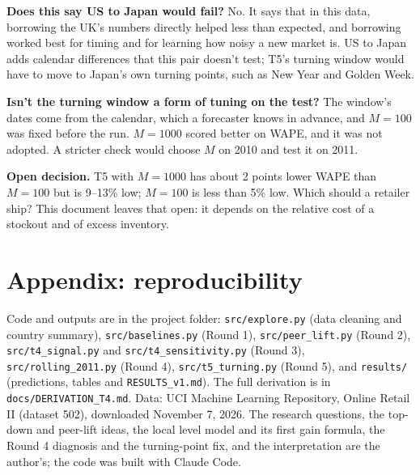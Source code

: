 \documentclass[11pt]{article}
\begin{document}
\textbf{Does this say US to Japan would fail?} No. It says that in this data, borrowing the UK's numbers
directly helped less than expected, and borrowing worked best for timing and for learning how noisy a new
market is. US to Japan adds calendar differences that this pair doesn't test; T5's turning window would
have to move to Japan's own turning points, such as New Year and Golden Week.

\textbf{Isn't the turning window a form of tuning on the test?} The window's dates come from the calendar,
which a forecaster knows in advance, and $M = 100$ was fixed before the run. $M = 1000$ scored better on
WAPE, and it was not adopted. A stricter check would choose $M$ on 2010 and test it on 2011.

\textbf{Open decision.} T5 with $M = 1000$ has about 2 points lower WAPE than $M = 100$ but is 9--13\%
low; $M = 100$ is less than 5\% low. Which should a retailer ship? This document leaves that open: it
depends on the relative cost of a stockout and of excess inventory.

\section*{Appendix: reproducibility}
\sloppy

Code and outputs are in the project folder: \texttt{src/explore.py} (data cleaning and country summary),
\texttt{src/baselines.py} (Round 1), \texttt{src/peer\_lift.py} (Round 2), \texttt{src/t4\_signal.py} and
\texttt{src/t4\_sensitivity.py} (Round 3), \texttt{src/rolling\_2011.py} (Round 4),
\texttt{src/t5\_turning.py} (Round 5), and \texttt{results/} (predictions, tables and
\texttt{RESULTS\_v1.md}). The full derivation is in \texttt{docs/DERIVATION\_T4.md}. Data: UCI Machine
Learning Repository, Online Retail II (dataset 502), downloaded November 7, 2026. The research questions,
the top-down and peer-lift ideas, the local level model and its first gain formula, the Round 4 diagnosis
and the turning-point fix, and the interpretation are the author's; the code was built with Claude Code.
\end{document}
